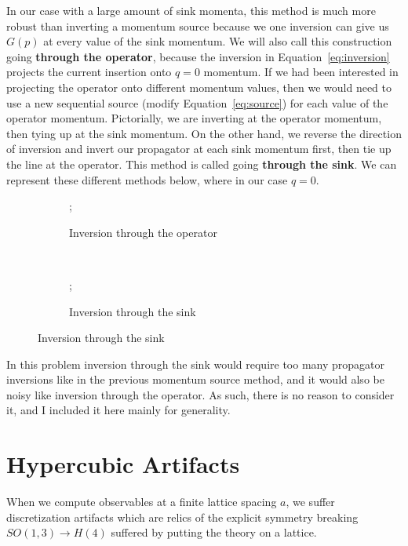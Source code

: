 \documentclass[11pt, oneside]{article}   	%
\theoremstyle{definition}
\begin{document}
In our case with a large amount of sink momenta, this method is much more robust than inverting a momentum source 
because we one inversion can give us $G(p)$ at every value of the sink momentum. We will also call this construction going 
\textbf{through the operator}, because the inversion in Equation~\ref{eq:inversion} projects the current insertion onto $q = 0$ 
momentum. If we had been interested in projecting the operator onto different momentum values, then we would need to use a 
new sequential source (modify Equation~\ref{eq:source}) for each value of the operator momentum. Pictorially, we are 
inverting at the operator momentum, then tying up at the sink momentum. On the other hand, we reverse the direction of 
inversion and invert our propagator at each sink momentum first, then tie up the line at the operator. This method is called 
going \textbf{through the sink}. We can represent these different methods below, where in our case $q = 0$. 
\begin{figure}[H]
	\centering
	\begin{subfigure}[t]{.48\textwidth}
	\centering
		;
            	\caption{Inversion through the operator}
	\end{subfigure}
	~
	\begin{subfigure}[t]{.48\textwidth}
	\centering
		;
            	\caption{Inversion through the sink}
	\end{subfigure}
\end{figure}

In this problem inversion through the sink would require too many propagator inversions like in the previous momentum 
source method, and it would also be noisy like inversion through the operator. As such, there is no reason to consider it, 
and I included it here mainly for generality. 

\section{Hypercubic Artifacts}
\label{sec:artifacts}

When we compute observables at a finite lattice spacing $a$, we suffer discretization artifacts which are relics of the explicit 
symmetry breaking $SO(1, 3)\rightarrow H(4)$ suffered by putting the theory on a lattice. 
\end{document}
